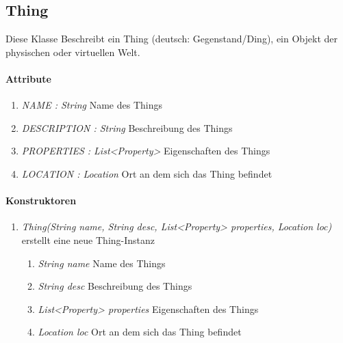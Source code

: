 \subsection*{Thing}\label{thing}
Diese Klasse Beschreibt ein Thing (deutsch: Gegenstand/Ding), ein Objekt der physischen oder virtuellen Welt.

\paragraph{Attribute}
\begin{enumerate}[$\bullet$]
	\item \textit{NAME : String} Name des Things
	\item \textit{DESCRIPTION : String} Beschreibung des Things
	\item \textit{PROPERTIES : List<Property>} Eigenschaften des Things
	\item \textit{LOCATION : Location} Ort an dem sich das Thing befindet
\end{enumerate}

\paragraph{Konstruktoren}
\begin{enumerate}[+]
	\item \textit{Thing(String name, String desc, List<Property> properties, Location loc)}
	erstellt eine neue Thing-Instanz
	\begin{enumerate}[$\bullet$]
		\item \textit{String name} Name des Things
		\item \textit{String desc} Beschreibung des Things
		\item \textit{List<Property> properties} Eigenschaften des Things
		\item \textit{Location loc} Ort an dem sich das Thing befindet
	\end{enumerate}
	
\end{enumerate}
